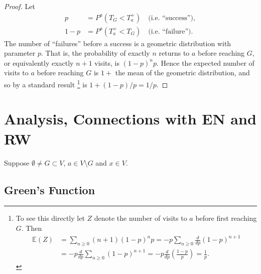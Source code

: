 \documentclass[a4paper]{amsart}
\theoremstyle{plain}
\theoremstyle{definition}
\theoremstyle{remark}
\begin{document}
\begin{proof}  Let
\begin{align*}
p &= P^a (T_G < T^+_a)  \quad \text{(i.e.\ ``success'')},\\
1-p &= P^a (T^+_a< T_G)  \quad \text{(i.e.\ ``failure'')}.
\end{align*}
The  number of ``failures'' before a success is  a geometric distribution with parameter $ p $.  That is,  the probability of exactly $ n $ returns to $ a $ before reaching $G$, or equivalently exactly $ n+1 $ visits,  is $ (1-p)^n p $.  Hence the expected number of visits to $  a $ before reaching $ G $ is  $1   + $ the mean of the geometric distribution, and  so by a standard result%
\footnote{To see this directly let $ Z $ denote the number of visits to $ a $ before first reaching $ G $. Then 
\begin{align*}
\mathbb{E} (Z) &= \sum_{n\geq 0} (n+1) (1-p)^n p 
 =-p\sum_{n\geq 0} \frac{d}{dp}(1-p)^{n+1}  \\
& = -p \frac{d}{dp}\sum_{n\geq 0}(1-p)^{n+1}   
 = -p\frac{d}{dp}\left(\frac{1-p}{p} \right)  =\frac{1}{p}.
\end{align*}
}
  is $ 1+ (1-p)/p = 1/p$.
  \end{proof} 





 



\section{\textbf{Analysis, Connections with EN and RW}} \label{secER}
Suppose $ \emptyset \neq G \subset V $, $ a \in V \setminus G $ and $ x \in V $.  



\subsection{Green's Function}   \label{secgf}
\end{document}
